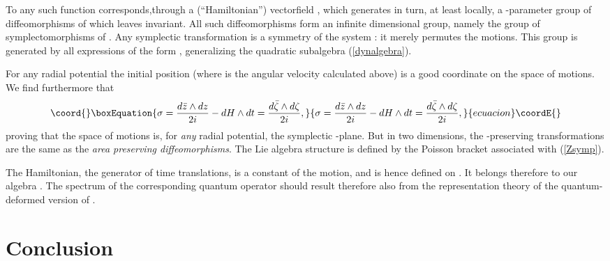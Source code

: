 \documentclass[a4paper,11pt]{article}
\let\ssection=\section
\renewcommand{\section}{\setcounter{equation}{0}\ssection}
\begin{document}
To any such function \coordHE{} corresponds,through
\coordHE{}
a (``Hamiltonian'')  vectorfield \coordHE{},
which generates in turn, at least locally, a \coordHE{}-parameter
group of diffeomorphisms of \coordHE{} which leaves
\myHighlight{$\sigma$}\coordHE{} invariant.
All such diffeomorphisms
form an infinite dimensional group, namely the group of
symplectomorphisms  of \coordHE{}. Any symplectic transformation is a
symmetry of the system : it merely permutes the motions. This group is
generated by all expressions of the form \coordHE{}, generalizing
the quadratic subalgebra (\ref{dynalgebra}).

For any radial potential \coordHE{}  the initial position
\coordHE{}
(where \myHighlight{$\omega$}\coordHE{} is the angular velocity
calculated above)
is a good coordinate on the space of motions.
We find furthermore that
\begin{equation}\coord{}\boxEquation{
     \sigma=\frac{d\bar{z}\wedge dz}{2i}-dH\wedge dt
     =\frac{d\bar{\zeta}\wedge d\zeta}{2i},
     \label{Zsymp}
}{
     \sigma=\frac{d\bar{z}\wedge dz}{2i}-dH\wedge dt
     =\frac{d\bar{\zeta}\wedge d\zeta}{2i},
     }{ecuacion}\coordE{}\end{equation}
proving that the space of  motions is, for {\it any} radial potential,
the symplectic \myHighlight{$\zeta$}\coordHE{}-plane.
But in two dimensions, the \myHighlight{$\Omega$}\coordHE{}-preserving transformations
are the same as the {\it area preserving
diffeomorphisms}. The Lie algebra structure is defined by the
Poisson bracket associated with (\ref{Zsymp}).


The Hamiltonian, the generator of time translations,
is a constant of the motion, and is hence defined
on \coordHE{}. It
belongs therefore to our algebra \coordHE{}. The spectrum of the
corresponding
quantum operator should  result therefore also from the representation
theory of the quantum-deformed version of \coordHE{}.

\section{Conclusion}
\end{document}
